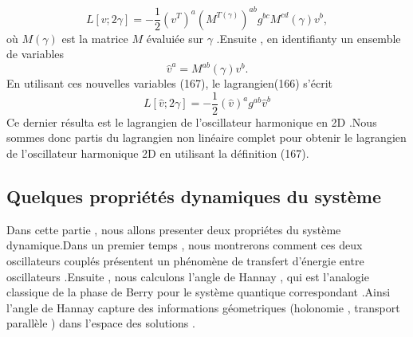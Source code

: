 \documentclass[12pt,a4paper, openany]{article}
\begin{document}
		 	\begin{equation}
		 	L[v;2\gamma]=-\frac{1}{2}\left(v^{T}\right)^a \left(M^{{T}(\gamma)}\right)^{ab}	g^{bc}M^{cd}(\gamma)v^b ,
		 	\end{equation}
		 	où $M(\gamma)$ est la matrice $M$ évaluiée sur $\gamma$ .Ensuite , en identifianty un ensemble de variables
		 	\begin{equation}
		 		\hat{v}^a=M^{ab}(\gamma)v^b.
		 	\end{equation} 
		 	En utilisant ces nouvelles variables (167), le lagrangien(166) s'écrit 
		 	\begin{equation}
		 	L[\hat{v};2\gamma]=-\frac{1}{2}\left(\hat{v}\right)^{a}	g^{ab}\hat{v}^{b}
		 	\end{equation}
		 	Ce dernier résulta est le lagrangien de l'oscillateur harmonique en 2D .Nous sommes donc partis du lagrangien non linéaire complet pour obtenir le lagrangien de l'oscillateur harmonique 2D en utilisant la définition (167).
		 	\subsection{Quelques propriétés dynamiques du système}
		 	Dans cette partie , nous allons presenter deux propriétes du système dynamique.Dans un premier temps , nous montrerons comment ces deux oscillateurs couplés présentent un phénomène de transfert d'énergie entre oscillateurs .Ensuite , nous calculons l'angle de Hannay , qui est l'analogie  classique de la phase de Berry pour le système quantique correspondant .Ainsi l'angle de Hannay capture des informations géometriques (holonomie , transport parallèle ) dans l'espace des solutions .
\end{document}
